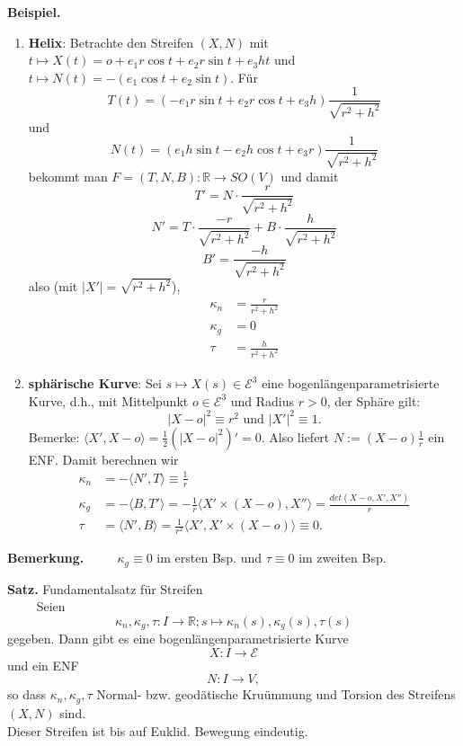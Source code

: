 \documentclass[a4paper,oneside,11pt,DIV=12,parskip=half]{scrartcl}
\newcommand{\R}{\mathbb R}
\newcommand{\E}{\mathcal E}
\newenvironment{note}{\textbf{Bemerkung.} ~~~~}{}
\newenvironment{theorem}[1][]{\textbf{Satz.} #1~~~~}{}
\newenvironment{example}{\textbf{Beispiel.} ~~~~}{}
\newenvironment{lemma, definition}{\textbf{Lemma und Definition.} ~~~~}{}
\newenvironment{note, example}{\textbf{Bemerkung und Beispiel.} ~~~~}{}
\newenvironment{note, definition}{\textbf{Bemerkung und Definition.} ~~~~}{}
\begin{document}
\begin{example}
	\begin{enumerate}
		 \item \textbf {Helix}: Betrachte den Streifen $(X,N)$ mit $t \mapsto X(t) = o + e_1r\cos t + e_2r \sin t + e_3ht$ und 
		$t \mapsto N(t) = -(e_1\cos t + e_2 \sin t)$.
		Für $$T(t) = (-e_1r\sin t + e_2r \cos t + e_3h) \frac{1}{\sqrt{r^2 + h^2}}$$ und
		$$N(t) = (e_1h\sin t - e_2h \cos t + e_3r) \frac{1}{\sqrt{r^2 + h^2}}$$ bekommt man
		$F = (T,N,B): \R \rightarrow SO(V)$ und damit \[ T' = N \cdot \frac{r}{\sqrt{r^2 + h^2}} \]		\[ N' = T \cdot \frac{-r}{\sqrt{r^2 + h^2}} + B \cdot \frac{h}{\sqrt{r^2 + h^2}} \]	
		\[B'= \frac{-h}{\sqrt{r^2 +h^2}}\]
		also (mit $|X'|=\sqrt{r^2 + h^2}$),
		\begin{align*}
		\kappa_n & = \frac{r}{r^2 + h^2} \\
		\kappa_g & = 0 \\
		\tau & = \frac{h}{r^2+ h^2} 
		\end{align*} 
		
		\item \textbf{sphärische Kurve}: Sei $s\mapsto X(s) \in \E^3$ eine bogenlängenparametrisierte Kurve, d.h., mit Mittelpunkt $o \in \E^3$ und Radius $r>0$, der Sphäre gilt:
		\[ |X-o|^2 \equiv r^2 \text{ und } |X'|^2 \equiv 1  .\]
		Bemerke:
		$\langle X',X-o \rangle = \frac 12 (|X-o|^2)' = 0  .$
		Also liefert $N :=(X-o)\frac 1r $ ein ENF. Damit berechnen wir
		\begin{align*}
			\kappa_n &= - \langle N', T \rangle \equiv \frac 1r\\
			\kappa_g &= - \langle B, T' \rangle = - \frac 1r \langle X' \times (X-o), X'' \rangle = \frac{det(X-o,X',X'')}{r}\\
			\tau &= \langle N',B\rangle = \frac{1}{r^2} \langle X',X'\times (X-o) \rangle \equiv 0  .
			\end{align*}
		 
	\end{enumerate}

\end{example}

\begin{note}
	$\kappa_g \equiv 0$ im ersten Bsp. und $\tau \equiv 0$ im zweiten Bsp.
\end{note}

\begin{theorem}[Fundamentalsatz für Streifen\\]
	Seien $$\kappa_n, \kappa_g, \tau: I \rightarrow \R; s \mapsto \kappa_n(s), \kappa_g(s), \tau(s)$$ gegeben. Dann gibt es eine bogenlängenparametrisierte Kurve $$X: I \rightarrow \E$$ und ein ENF $$N: I \rightarrow V  ,$$ so dass $\kappa_n, \kappa_g, \tau$ Normal- bzw. geodätische Kruümmung und Torsion des Streifens $(X,N)$ sind.\\ Dieser Streifen ist bis auf Euklid. Bewegung eindeutig.
\end{theorem}
\end{document}
